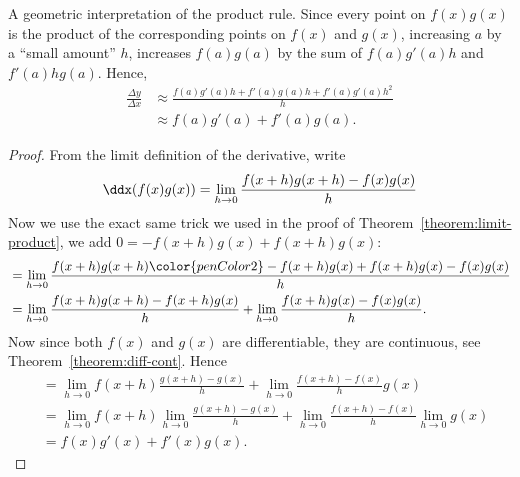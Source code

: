 \begin{marginfigure}
\caption[A geometric interpretation of the product rule.]{A geometric interpretation of the product rule. Since every
  point on $f(x)g(x)$ is the product of the corresponding points on
  $f(x)$ and $g(x)$, increasing $a$ by a ``small amount'' $h$,
  increases $f(a)g(a)$ by the sum of $f(a)g'(a)h$ and
  $f'(a)hg(a)$. Hence,
\begin{align*}
\frac{\Delta y}{\Delta x} &\approx \frac{f(a)g'(a)h+f'(a)g(a)h + f'(a)g'(a)h^2}{h}\\
&\approx f(a)g'(a) + f'(a)g(a).
\end{align*}}
\end{marginfigure}

\begin{proof}
From the limit definition of the derivative, write
\[
\ddx (f(x)g(x)) = \lim_{h \to0} \frac{f(x+h)g(x+h) - f(x)g(x)}{h}
\]
Now we use the exact same trick we used in the proof of
Theorem~\ref{theorem:limit-product}, we add $0 = -f(x+h)g(x) + f(x+h)g(x)$:
\begin{align*}
&=\lim_{h \to0} \frac{f(x+h)g(x+h){\color{penColor2}-f(x+h)g(x) + f(x+h)g(x)}- f(x)g(x)}{h} \\ 
&=\lim_{h \to0} \frac{f(x+h)g(x+h)-f(x+h)g(x)}{h} + \lim_{h \to0} \frac{f(x+h)g(x)- f(x)g(x)}{h}.
\end{align*}
Now since both $f(x)$ and $g(x)$ are differentiable, they are
continuous, see Theorem~\ref{theorem:diff-cont}. Hence
\begin{align*}
&=\lim_{h \to0} f(x+h)\frac{g(x+h)-g(x)}{h} + \lim_{h \to0} \frac{f(x+h)- f(x)}{h}g(x) \\ 
&=\lim_{h \to0} f(x+h)\lim_{h \to0}\frac{g(x+h)-g(x)}{h} + \lim_{h \to0} \frac{f(x+h)- f(x)}{h}\lim_{h \to0}g(x) \\ 
&=f(x)g'(x) + f'(x)g(x).
\end{align*}
\end{proof}



